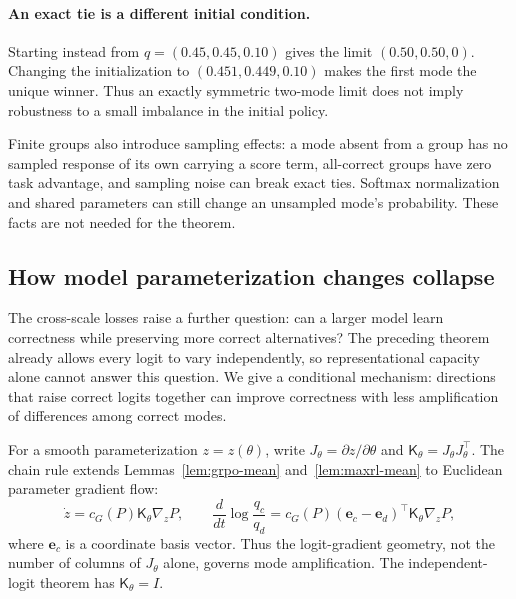 \documentclass{article}
\newcommand{\1}{\mathbf 1}
\theoremstyle{remark}
\theoremstyle{definition}
\theoremstyle{plain}
\begin{document}
\paragraph{An exact tie is a different initial condition.}
Starting instead from $q=(0.45,0.45,0.10)$ gives the limit
$(0.50,0.50,0)$. Changing the initialization to $(0.451,0.449,0.10)$ makes
the first mode the unique winner. Thus an exactly symmetric two-mode limit
does not imply robustness to a small imbalance in the initial policy.

Finite groups also introduce sampling effects: a mode absent from
a group has no sampled response of its own carrying a score term,
all-correct groups have zero task advantage, and sampling noise can break exact
ties. Softmax normalization and shared parameters can still change an
unsampled mode's probability. These facts are not needed for
the theorem.

\subsection{How model parameterization changes collapse}
\label{app:theory-size}

The cross-scale losses raise a further question: can a larger model learn
correctness while preserving more correct alternatives? The preceding theorem
already allows every logit to vary independently, so representational capacity
alone cannot answer this question. We give a conditional mechanism: directions
that raise correct logits together can improve correctness with less
amplification of differences among correct modes.

For a smooth parameterization $z=z(\theta)$, write
$J_\theta=\partial z/\partial\theta$ and
$\mathsf K_\theta=J_\theta J_\theta^\top$. The chain rule extends
Lemmas~\ref{lem:grpo-mean} and~\ref{lem:maxrl-mean} to Euclidean parameter
gradient flow:
\begin{equation}
 \dot z=c_G(P)\mathsf K_\theta\nabla_zP,
 \qquad
 \frac{d}{dt}\log\frac{q_c}{q_d}
 =c_G(P)(\mathbf e_c-\mathbf e_d)^\top\mathsf K_\theta\nabla_zP,
 \label{eq:parameterized-collapse}
\end{equation}
where $\mathbf e_c$ is a coordinate basis vector. Thus the logit-gradient geometry,
not the number of columns of $J_\theta$ alone, governs mode amplification.
The independent-logit theorem has $\mathsf K_\theta=I$.
\end{document}
